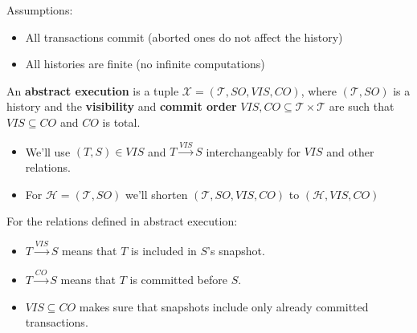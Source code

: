 \documentclass{beamer}
\begin{document}
\begin{frame}
	Assumptions:
	\begin{itemize}
		\item All transactions commit (aborted ones do not affect the history)
		\item All histories are finite (no infinite computations)
	\end{itemize}
\end{frame}

\begin{frame}
	\begin{definition}
		An \textbf{abstract execution} is a tuple $ \mathcal{X} = (\mathcal{T}, SO, VIS, CO) $, where $(\mathcal{T}, SO)$ is a history and the \textbf{visibility} and \textbf{commit order} $ VIS, CO \subseteq \mathcal{T} \times \mathcal{T} $ are such that $ VIS \subseteq CO $ and $CO$ is total.
	\end{definition}
\end{frame}

\begin{frame}
	\begin{itemize}
		\item We'll use $ (T, S) \in VIS$ and $ T \xrightarrow{VIS} S $ interchangeably for $VIS$ and other relations.
		\item For $\mathcal{H}=(\mathcal{T}, SO)$ we'll shorten $(\mathcal{T}, SO, VIS, CO)$ to $(\mathcal{H}, VIS, CO)$
	\end{itemize}
\end{frame}

\begin{frame}
	For the relations defined in abstract execution:
	\begin{itemize}
		\item $ T \xrightarrow{VIS} S $ means that $T$ is included in $S$'s snapshot.
		\item $ T \xrightarrow{CO} S $ means that $T$ is committed before $S$.
		\item $ VIS \subseteq CO $ makes sure that snapshots include only already committed transactions.
	\end{itemize}
\end{frame}
\end{document}
